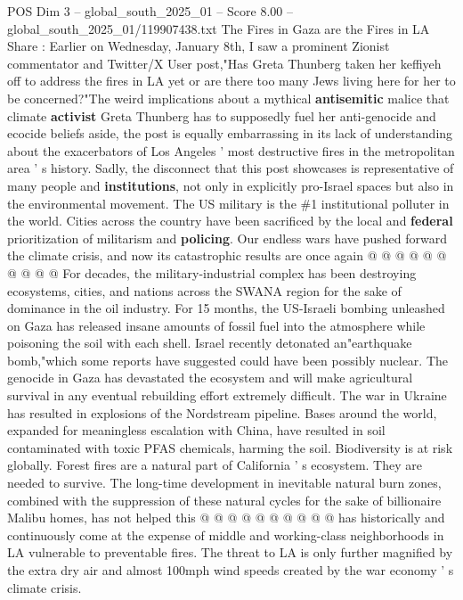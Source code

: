 \begin{textsample}{POS Dim 3 – global\_south\_2025\_01 – Score 8.00 – global\_south\_2025\_01/119907438.txt}  \label{ex:f3_pos_407}
The Fires in Gaza are the Fires in LA Share : Earlier on Wednesday, January 8th, I saw a prominent Zionist commentator and Twitter/X User post,"Has Greta Thunberg taken her keffiyeh off to address the fires in LA yet or are there too many Jews living here for her to be concerned?"The weird implications about a mythical \textbf{antisemitic} malice that climate \textbf{activist} Greta Thunberg has to supposedly fuel her anti-genocide and ecocide beliefs aside, the post is equally embarrassing in its lack of understanding about the exacerbators of Los Angeles ' most destructive fires in the metropolitan area ' s history.
Sadly, the disconnect that this post showcases is representative of many people and \textbf{institutions}, not only in explicitly pro-Israel spaces but also in the environmental movement.
The US military is the \#1 institutional polluter in the world.
Cities across the country have been sacrificed by the local and \textbf{federal} prioritization of militarism and \textbf{policing}.
Our endless wars have pushed forward the climate crisis, and now its catastrophic results are once again @ @ @ @ @ @ @ @ @ @ For decades, the military-industrial complex has been destroying ecosystems, cities, and nations across the SWANA region for the sake of dominance in the oil industry.
For 15 months, the US-Israeli bombing unleashed on Gaza has released insane amounts of fossil fuel into the atmosphere while poisoning the soil with each shell.
Israel recently detonated an"earthquake bomb,"which some reports have suggested could have been possibly nuclear.
The genocide in Gaza has devastated the ecosystem and will make agricultural survival in any eventual rebuilding effort extremely difficult.
The war in Ukraine has resulted in explosions of the Nordstream pipeline.
Bases around the world, expanded for meaningless escalation with China, have resulted in soil contaminated with toxic PFAS chemicals, harming the soil.
Biodiversity is at risk globally.
Forest fires are a natural part of California ' s ecosystem.
They are needed to survive.
The long-time development in inevitable natural burn zones, combined with the suppression of these natural cycles for the sake of billionaire Malibu homes, has not helped this @ @ @ @ @ @ @ @ @ @ has historically and continuously come at the expense of middle and working-class neighborhoods in LA vulnerable to preventable fires.
The threat to LA is only further magnified by the extra dry air and almost 100mph wind speeds created by the war economy ' s climate crisis.

\end{textsample}
